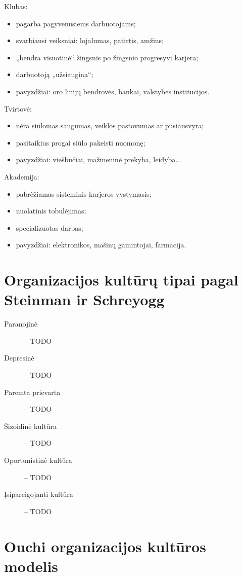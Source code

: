 Klubas:
\begin{itemize}
  \item pagarba pagyvenusiems darbuotojams;
  \item svarbiausi veiksniai: lojalumas, patirtis, amžius;
  \item „bendra visuotinė“ žingsnis po žingsnio progresyvi karjera;
  \item darbuotoją „užsiaugina“;
  \item pavyzdžiai: oro linijų bendrovės, bankai, valstybės institucijos.
\end{itemize}

Tvirtovė:
\begin{itemize}
  \item nėra siūlomas saugumas, veiklos pastovumas ar pusiausvyra;
  \item pasitaikius progai siūlo pakeisti nuomonę;
  \item pavyzdžiai: viešbučiai, mažmeninė prekyba, leidyba…
\end{itemize}

Akademija:
\begin{itemize}
  \item pabrėžiamas sisteminis karjeros vystymasis;
  \item nuolatinis tobulėjimas;
  \item specializuotas darbas;
  \item pavyzdžiai: elektronikos, mašinų gamintojai, farmacija.
\end{itemize}

\section{Organizacijos kultūrų tipai pagal Steinman ir Schreyogg}

\begin{description}
  \item[Paranojinė] – TODO
  \item[Depresinė] – TODO
  \item[Paremta prievarta] – TODO
  \item[Šizoidinė kultūra] – TODO
  \item[Oportunistinė kultūra] – TODO
  \item[Įsipareigojanti kultūra] – TODO
\end{description}

\section{Ouchi organizacijos kultūros modelis}

